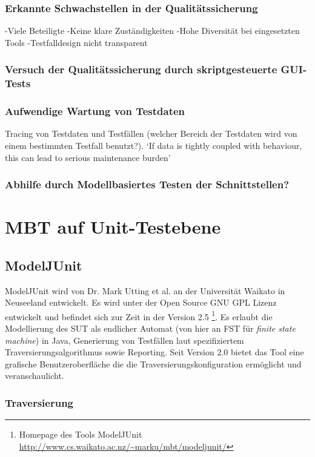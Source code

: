 \subsubsection{Erkannte Schwachstellen in der Qualitätssicherung}
-Viele Beteiligte
-Keine klare Zuständigkeiten
-Hohe Diversität bei eingesetzten Tools
-Testfalldesign nicht transparent
\subsubsection{Versuch der Qualitätssicherung durch skriptgesteuerte GUI-Tests}

\subsubsection{Aufwendige Wartung von Testdaten}
Tracing von Testdaten und Testfällen (welcher Bereich der Testdaten wird von einem bestimmten Testfall benutzt?). `If data is tightly coupled with behaviour, this can lead to serious maintenance burden' \cite{baker_model-driven_2005} 
\subsubsection{Abhilfe durch Modellbasiertes Testen der Schnittstellen?}


\section{MBT auf Unit-Testebene}
\subsection{ModelJUnit}
\label{sec:modeljunit}
ModelJUnit wird von Dr. Mark Utting et al. an der Universität Waikato in Neuseeland entwickelt. Es wird unter der Open Source GNU GPL Lizenz entwickelt und befindet sich zur Zeit in der Version 2.5 \footnote{Homepage des Tools ModelJUnit \url{http://www.cs.waikato.ac.nz/~marku/mbt/modeljunit/}}. Es erlaubt die Modellierung des SUT als endlicher Automat (von hier an FST für \textit{finite state machine}) in Java, Generierung von Testfällen laut spezifiziertem Traversierungsalgorithmus sowie Reporting. Seit Version 2.0 bietet das Tool eine grafische Benutzeroberfläche die die Traversierungskonfiguration ermöglicht und veranschaulicht.\\
\subsubsection{Traversierung}

